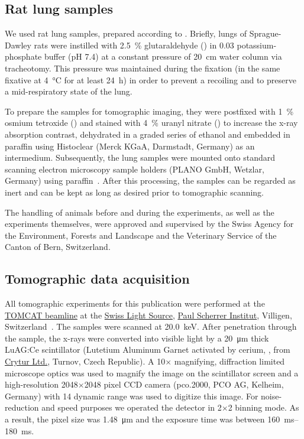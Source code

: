 \documentclass[%
	paper=a4,%
	twoside=true,%
	draft=false,%
	abstract=false]{scrartcl}
\newcommand{\todojcs}[2][]{\todo[color=magenta!62!white, #1]{Johannes: #2}}
\begin{document}
\subsection{Rat lung samples}
We used rat lung samples, prepared according to \cite{Tschanz2002,Luyet2002}. Briefly, lungs of Sprague-Dawley rats were instilled with \SI{2.5}{\percent} glutaraldehyde () in \SI{0.03}{\Molar} potassium-phosphate buffer (pH 7.4) at a constant pressure of \SI{20}{\centi\meter} water column via tracheotomy. This pressure was maintained during the fixation (in the same fixative at \SI{4}{\celsius} for at least \SI{24}{\hour}) in order to prevent a recoiling and to preserve a mid-respiratory\todojcs{Is mid-respiratory true, or is this full volume?} state of the lung.

To prepare the samples for tomographic imaging, they were postfixed with \SI{1}{\percent} osmium tetroxide () and stained with \SI{4}{\percent} uranyl nitrate () to increase the x-ray absorption contrast, dehydrated in a graded series of ethanol and embedded in paraffin using Histoclear (Merck KGaA, Darmstadt, Germany) as an intermedium. Subsequently, the lung samples were mounted onto standard scanning electron microscopy sample holders (PLANO GmbH, Wetzlar, Germany) using paraffin~\cite{Tsuda2008}. After this processing, the samples can be regarded as inert and can be kept as long as desired prior to tomographic scanning.

The handling of animals before and during the experiments, as well as the experiments themselves, were approved and supervised by the Swiss Agency for the Environment, Forests and Landscape and the Veterinary Service of the Canton of Bern, Switzerland.

\subsection{Tomographic data acquisition}\label{sec:tomcat}
All tomographic experiments for this publication were performed at the \href{http://www.psi.ch/sls/tomcat/}{TOMCAT beamline} at the \href{http://www.psi.ch/sls/}{Swiss Light Source}, \href{http://www.psi.ch/}{Paul Scherrer Institut}, Villigen, Switzerland~\cite{Stampanoni2006a}. The samples were scanned at \SI{20.0}{\kilo\electronvolt}. After penetration through the sample, the x-rays were converted into visible light by a \SI{20}{\micro\meter} thick LuAG:Ce scintillator (Lutetium Aluminum Garnet activated by cerium, , from \href{http://www.crytur.cz/}{Crytur Ltd.}, Turnov, Czech Republic). A 10\(\times\) magnifying, diffraction limited microscope optics was used to magnify the image on the scintillator screen and a high-resolution 2048\(\times\)2048 pixel CCD camera (pco.2000, PCO AG, Kelheim, Germany) with \SI{14}{\bit} dynamic range was used to digitize this image. For noise-reduction and speed purposes we operated the detector in 2\(\times\)2 binning mode. As a result, the pixel size was \SI{1.48}{\micro\meter} and the exposure time was between \SIrange{160}{180}{\milli\second}.
\end{document}
